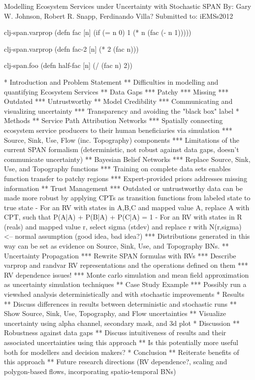 Modelling Ecosystem Services under Uncertainty with Stochastic SPAN
By: Gary W. Johnson, Robert R. Snapp, Ferdinando Villa?
Submitted to: iEMSs2012

\begin{chunk}{clj-span.varprop}
(defn fac [n]
  (if (= n 0)
    1
    (* n (fac (- n 1)))))
\end{chunk}

\begin{chunk}{clj-span.varprop}
(defn fac-2 [n]
  (* 2 (fac n)))
\end{chunk}

\begin{chunk}{clj-span.foo}
(defn half-fac [n]
  (/ (fac n) 2))
\end{chunk}


* Introduction and Problem Statement
** Difficulties in modelling and quantifying Ecosystem Services
** Data Gaps
*** Patchy
*** Missing
*** Outdated
*** Untrustworthy
** Model Credibility
*** Communicating and visualizing uncertainty
*** Transparency and avoiding the "black box" label
* Methods
** Service Path Attribution Networks
*** Spatially connecting ecosystem service producers to their human beneficiaries via simulation
*** Source, Sink, Use, Flow (inc. Topography) components
*** Limitations of the current SPAN formalism (deterministic, not robust against data gaps, doesn't communicate uncertainty)
** Bayesian Belief Networks
*** Replace Source, Sink, Use, and Topography functions
*** Training on complete data sets enables function transfer to patchy regions
*** Expert-provided priors addresses missing information
** Trust Management
*** Outdated or untrustworthy data can be made more robust by applying CPTs as transition functions from labeled state to true state
    - For an RV with states in {A,B,C} and mapped value A, replace A with CPT, such that P(A|A) + P(B|A) + P(C|A) = 1
    - For an RV with states in R (reals) and mapped value r, select sigma (stdev) and replace r with N(r,sigma) <-- normal assumption (good idea, bad idea?)
*** Distributions generated in this way can be set as evidence on Source, Sink, Use, and Topography BNs.
** Uncertainty Propagation
*** Rewrite SPAN formulas with RVs
*** Describe varprop and randvar RV representations and the operations defined on them
*** RV dependence issues!
*** Monte carlo simulation and mean field approximation as uncertainty simulation techniques
** Case Study Example
*** Possibly run a viewshed analysis deterministically and with stochastic improvements 
* Results
** Discuss differences in results between deterministic and stochastic runs
** Show Source, Sink, Use, Topography, and Flow uncertainties
** Visualize uncertainty using alpha channel, secondary mask, and 3d plot
* Discussion
** Robustness against data gaps
** Discuss intuitiveness of results and their associated uncertainties using this approach
** Is this potentially more useful both for modellers and decision makers?
* Conclusion
** Reiterate benefits of this approach
** Future research directions (RV dependence?, scaling and polygon-based flows, incorporating spatio-temporal BNs)
